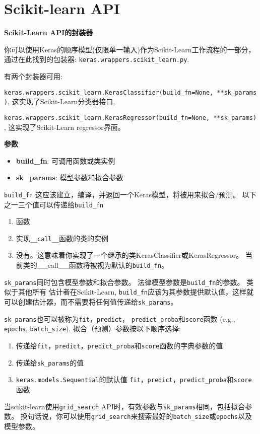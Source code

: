\section{Scikit-learn API}
\textbf{Scikit-Learn API的封装器}

你可以使用Keras的顺序模型(仅限单一输入)作为Scikit-Learn工作流程的一部分，通过在此找到的包装器:
\texttt{keras.wrappers.scikit\_learn.py}.

有两个封装器可用:

\texttt{keras.wrappers.scikit\_learn.KerasClassifier(build\_fn=None,\ **sk\_params)},
这实现了Scikit-Learn分类器接口,

\texttt{keras.wrappers.scikit\_learn.KerasRegressor(build\_fn=None,\ **sk\_params)},
这实现了Scikit-Learn regressor界面。

\textbf{参数}
\begin{itemize}
\tightlist
\item
  \textbf{build\_fn}: 可调用函数或类实例
\item
  \textbf{sk\_params}: 模型参数和拟合参数
\end{itemize}

\texttt{build\_fn}
这应该建立，编译，并返回一个Keras模型，将被用来拟合/预测。
以下之一三个值可以传递给\texttt{build\_fn}

\begin{enumerate}
\def\labelenumi{\arabic{enumi}.}
\tightlist
\item
  函数
\item
  实现\texttt{\_\_call\_\_}函数的类的实例
\item
  没有。这意味着你实现了一个继承的类KerasClassifier或KerasRegressor。
  当前类的\_\_call\_\_函数将被视为默认的\texttt{build\_fn}。
\end{enumerate}

\texttt{sk\_params}同时包含模型参数和拟合参数。
法律模型参数是\texttt{build\_fn}的参数。 类似于其他所有
估计者在Scikit-Learn,
\texttt{build\_fn}应该为其参数提供默认值，这样就可以创建估计器，而不需要将任何值传递给\texttt{sk\_params}。

\texttt{sk\_params}也可以被称为\texttt{fit}，\texttt{predict}，
\texttt{predict\_proba}和\texttt{score}函数 (e.g., \texttt{epochs},
\texttt{batch\_size}). 拟合（预测）参数按以下顺序选择:

\begin{enumerate}
\def\labelenumi{\arabic{enumi}.}
\tightlist
\item
  传递给\texttt{fit}，\texttt{predict}，\texttt{predict\_proba}和\texttt{score}函数的字典参数的值
\item
  传递给\texttt{sk\_params}的值
\item
  \texttt{keras.models.Sequential}的默认值
  \texttt{fit}，\texttt{predict}，\texttt{predict\_proba}和\texttt{score}函数
\end{enumerate}

当scikit-learn使用\texttt{grid\_search}
API时，有效参数与\texttt{sk\_params}相同，包括拟合参数。
换句话说，你可以使用\texttt{grid\_search}来搜索最好的\texttt{batch\_size}或\texttt{epochs}以及模型参数。
\newpage
